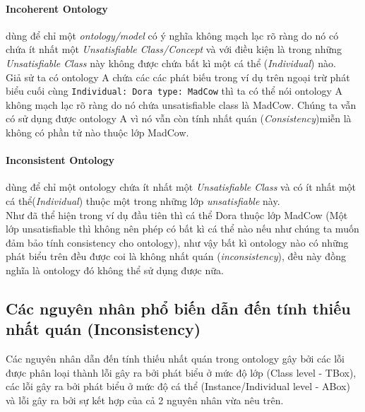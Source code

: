 \paragraph{Incoherent Ontology} dùng để chỉ một \textit{ontology/model} có ý nghĩa không mạch lạc rõ ràng do nó có chứa ít nhất một \textit{Unsatisfiable Class/Concept} và với điều kiện là trong những \textit{Unsatisfiable Class} này không được chứa bất kì một cá thể (\textit{Individual}) nào.
\\
\hspace{0.05\textwidth} Giả sử ta có ontology A chứa các các phát biếu trong ví dụ trên ngoại trừ phát biểu cuối cùng \texttt{Individual: Dora type: MadCow} thì ta có thể nói ontology A không mạch lạc rõ ràng do nó chứa unsatisfiable class là MadCow. Chúng ta vẫn có sử dụng được ontology A vì nó vẫn còn tính nhất quán (\textit{Consistency})miễn là không có phần tử nào thuộc lớp MadCow.
\paragraph{Inconsistent Ontology} dùng để chỉ một ontology chứa ít nhất một \textit{Unsatisfiable Class} và có ít nhất một cá thể(\textit{Individual}) thuộc một trong những lớp \textit{unsatisfiable} này.
\\
\hspace{0.05\textwidth} Như đã thể hiện trong ví dụ đầu tiên thì cá thể Dora thuộc lớp MadCow (Một lớp unsatisfiable thì không nên phép có bất kì cá thể nào nếu như chúng ta muốn đảm bảo tính consistency cho ontology), như vậy bất kì ontology nào có những phát biểu trên đều được coi là không nhất quán (\textit{inconsistency}), đều này đồng nghĩa là ontology đó không thể sử dụng được nữa.

\subsection{Các nguyên nhân phổ biến dẫn đến tính thiếu nhất quán (Inconsistency)\cite{inconsitentReason}}
Các nguyên nhân dẫn đến tính thiếu nhất quán trong ontology gây bởi các lỗi được phân loại thành lỗi gây ra bởi phát biểu ở mức độ lớp (Class level - TBox), các lỗi gây ra bởi phát biểu ở mức độ cá thể (Instance/Individual level - ABox) và lỗi gây ra bởi sự kết hợp của cả 2 nguyên nhân vừa nêu trên.
